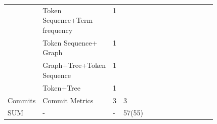 \begin{table}[t!]
{\begin{tabular}{p{0.13\linewidth}lllp{0.35\linewidth}}
                                            & Token Sequence+Term frequency & 1         &    &      \cite{sabetta2018practical}            \\
                                            & Token Sequence+ Graph         & 1         &    &      \cite{fu2022linevul}            \\
                                            & Graph+Tree+Token Sequence     & 1         &    &      \cite{li2021vulnerability}            \\
                                            & Token+Tree     & 1         &    &      \cite{zhang2022reentrancy}            \\
\hline
\multirow{1}{*}{Commits} & Commit Metrics & 3 & \multirow{1}{*}{3}                 &      \cite{pascarella2019fine,
Vuldiggerpaper,
ni2022best}            \\
                                            \hline
\multirow{1}{*}{SUM} & - & - & \multirow{1}{*}{57(55)}                 &      \cite{pascarella2019fine,
Vuldiggerpaper,
ni2022best}            \\         
\bottomrule
\end{tabular}
}
\label{tbl:represenation_dist_tbl}
\end{table}


